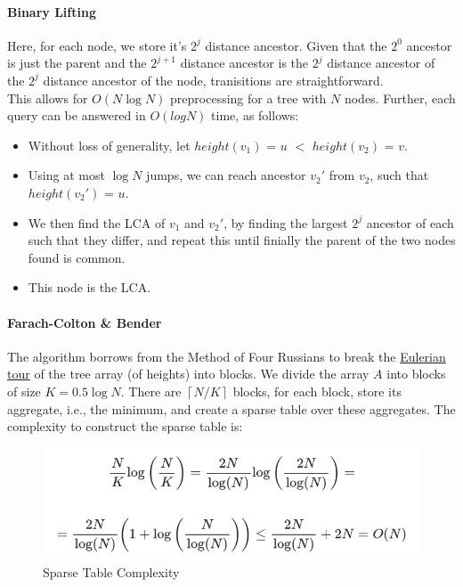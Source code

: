 \documentclass[12pt]{article}
\begin{document}
\paragraph{Binary Lifting\cite{lca_binary_lifting}}
Here, for each node, we store it's $2^j$ distance ancestor.  
Given that the $2^0$ ancestor is just the parent and the $2^{j+1}$ distance ancestor is the $2^j$ distance ancestor of the $2^j$ distance ancestor of the node, tranisitions are straightforward.  \\
This allows for $O(N\log N)$ preprocessing for a tree with $N$ nodes.  
Further, each query can be answered in $O(log N)$ time, as follows:
\begin{itemize}
  \item Without loss of generality, let $height(v_1)$ = $u$ $<$ $height(v_2)$ = $v$.
  \item Using at most $\log N$ jumps, we can reach ancestor $v_2'$ from $v_2$, such that $height(v_2')$ = $u$.
  \item We then find the LCA of $v_1$ and $v_2'$, by finding the largest $2^j$ ancestor of each such that they differ, and repeat this until finially the parent of the two nodes found is common.  
  \item This node is the LCA.
\end{itemize}

\paragraph{Farach-Colton \& Bender\cite{lca_farachcoltonbender}}
The algorithm borrows from the Method of Four Russians to break the \hyperref[https://usaco.guide/gold/tree-euler?lang=cpp]{Eulerian tour} of the tree array (of heights) into blocks.  
We divide the array $A$ into blocks of size $K = 0.5\log N$. There are $\left\lceil N/K \right\rceil$ blocks, for each block, store its aggregate, i.e., the minimum, and create a sparse table over these aggregates. The complexity to construct the sparse table is:  
\begin{figure}[H]
  \centering
  \includegraphics[width=0.7\linewidth]{sparse-calculations.png}
  \caption{Sparse Table Complexity\cite{lca_farachcoltonbender}}
\end{figure}
\end{document}
